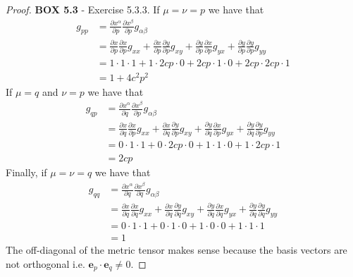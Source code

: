 \documentclass[11pt]{article}
\theoremstyle{definition}
\begin{document}
\begin{proof}{\textbf{BOX 5.3} - Exercise 5.3.3.}
    If $\mu=\nu=p$ we have that
    \begin{align*}
        g_{pp} &= \frac{\partial x^{\alpha}}{\partial p}\frac{\partial x^{\beta}}{\partial p}g_{\alpha\beta}\\
        &=\frac{\partial x}{\partial p}\frac{\partial x}{\partial p}g_{xx} +
        \frac{\partial x}{\partial p}\frac{\partial y}{\partial p}g_{xy} +
        \frac{\partial y}{\partial p}\frac{\partial x}{\partial p}g_{yx} +
        \frac{\partial y}{\partial p}\frac{\partial y}{\partial p}g_{yy}\\
        &= 1\cdot 1\cdot 1 + 1\cdot 2cp\cdot 0 + 2cp\cdot 1\cdot 0 + 2cp\cdot 2cp\cdot 1\\
        &= 1 + 4c^2p^2
    \end{align*}
    If $\mu=q$ and $\nu=p$ we have that
    \begin{align*}
        g_{qp} &= \frac{\partial x^{\alpha}}{\partial q}\frac{\partial x^{\beta}}{\partial p}g_{\alpha\beta}\\
        &=\frac{\partial x}{\partial q}\frac{\partial x}{\partial p}g_{xx} +
        \frac{\partial x}{\partial q}\frac{\partial y}{\partial p}g_{xy} +
        \frac{\partial y}{\partial q}\frac{\partial x}{\partial p}g_{yx} +
        \frac{\partial y}{\partial q}\frac{\partial y}{\partial p}g_{yy}\\
        &= 0\cdot 1\cdot 1 + 0\cdot 2cp\cdot 0 + 1\cdot 1\cdot 0 + 1\cdot 2cp\cdot 1\\
        &= 2cp
    \end{align*}
    Finally, if $\mu=\nu =q$ we have that
    \begin{align*}
        g_{qq} &= \frac{\partial x^{\alpha}}{\partial q}\frac{\partial x^{\beta}}{\partial q}g_{\alpha\beta}\\
        &=\frac{\partial x}{\partial q}\frac{\partial x}{\partial q}g_{xx} +
        \frac{\partial x}{\partial q}\frac{\partial y}{\partial q}g_{xy} +
        \frac{\partial y}{\partial q}\frac{\partial x}{\partial q}g_{yx} +
        \frac{\partial y}{\partial q}\frac{\partial y}{\partial q}g_{yy}\\
        &= 0\cdot 1\cdot 1 + 0\cdot 1\cdot 0 + 1\cdot 0\cdot 0 + 1\cdot 1\cdot 1\\
        &= 1
    \end{align*}
    The off-diagonal of the metric tensor makes sense because the basis vectors
    are not orthogonal i.e. $\bm{e}_p\cdot\bm{e}_q \neq 0$. 
\end{proof}
\end{document}
